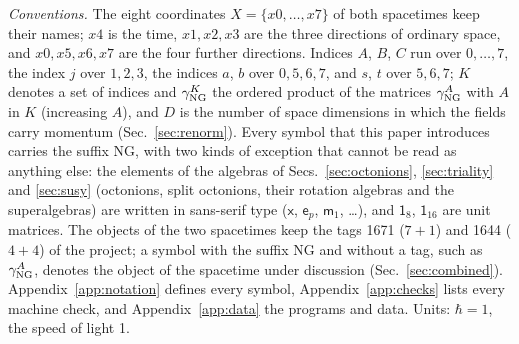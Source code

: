 \emph{Conventions.} The eight coordinates $X=\{x0,\dots,x7\}$ of both spacetimes keep their names;
$x4$ is the time, $x1,x2,x3$ are the three directions of ordinary space, and $x0,x5,x6,x7$ are the
four further directions. Indices $A$, $B$, $C$ run over $0,\dots,7$, the index $j$ over $1,2,3$, the
indices $a$, $b$ over $0,5,6,7$, and $s$, $t$ over $5,6,7$; $K$ denotes a set of indices and $\gamma^K_{\rm NG}$
the ordered product of the matrices $\gamma^A_{\rm NG}$ with $A$ in $K$ (increasing $A$), and $D$ is the number of space
dimensions in which the fields carry momentum (Sec.~\ref{sec:renorm}). Every symbol that this paper
introduces carries the suffix NG, with two kinds of exception that cannot be read as anything else:
the elements of the algebras of Secs.~\ref{sec:octonions}, \ref{sec:triality} and \ref{sec:susy} (octonions,
split octonions, their rotation algebras and the superalgebras) are written in sans-serif type ($\mathsf x$, $\mathsf e_p$,
$\mathsf m_1$, \dots), and $\mathsf 1_8$, $\mathsf 1_{16}$ are unit matrices. The objects of the two
spacetimes keep the tags 1671 ($7+1$) and 1644 ($4+4$) of the project; a symbol with the suffix NG and
without a tag, such as $\gamma^A_{\rm NG}$, denotes the object of the spacetime under discussion
(Sec.~\ref{sec:combined}). Appendix~\ref{app:notation} defines every symbol, Appendix~\ref{app:checks}
lists every machine check, and Appendix~\ref{app:data} the programs and data. Units: $\hbar=1$, the
speed of light 1.

